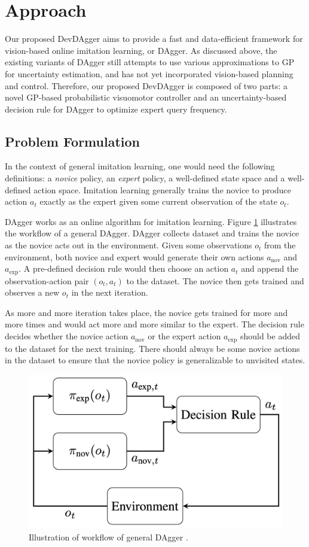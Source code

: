 \documentclass[11pt, reqno, letterpaper, twoside]{amsart}
\begin{document}
\section{Approach}
Our proposed DevDAgger aims to provide a fast and data-efficient framework for
vision-based online imitation learning, or DAgger. As discussed above, the
existing variants of DAgger still attempts to use various approximations to GP
for uncertainty estimation, and has not yet incorporated vision-based planning
and control. Therefore, our proposed DevDAgger is composed of two parts: a novel
GP-based probabilistic visuomotor controller and an uncertainty-based decision
rule for DAgger to optimize expert query frequency.

\subsection{Problem Formulation}
In the context of general imitation learning, one would need the following
definitions: a \textit{novice} policy, an \textit{expert} policy, a well-defined
state space and a well-defined action space. Imitation learning generally trains
the novice to produce action $a_t$ exactly as the expert given some current
observation of the state $o_t$.

DAgger works as an online algorithm for imitation learning. Figure
\ref{fig:dagger_diagram} illustrates the workflow of a general DAgger. DAgger
collects dataset and trains the novice as the novice acts out in the
environment. Given some observations $o_t$ from the environment, both novice and
expert would generate their own actions $a_\text{nov}$ and $a_\text{exp}$. A
pre-defined decision rule would then choose an action $a_t$ and append the
observation-action pair $(o_t,a_t)$ to the dataset. The novice then gets trained
and observes a new $o_t$ in the next iteration.

As more and more iteration takes place, the novice gets trained for more and
more times and would act more and more similar to the expert. The decision rule
decides whether the novice action $a_\text{nov}$ or the expert action
$a_\text{exp}$ should be added to the dataset for the next training. There
should always be some novice actions in the dataset to ensure that the novice
policy is generalizable to unvisited states.
\begin{figure}[htbp!]
	\centering
	\includegraphics[width=0.5\linewidth]{imgs/dagger_diagram.png}
	\caption{Illustration of workflow of general DAgger \cite{ensemble-dagger}.}
	\label{fig:dagger_diagram}
\end{figure}
\end{document}
